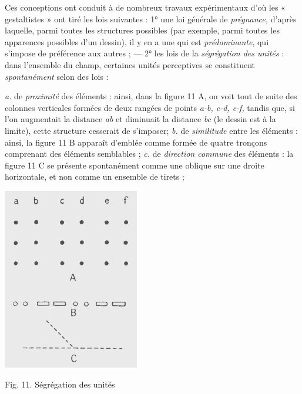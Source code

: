 \vspace{0.24cm}
{\footnotesize 
Ces conceptions ont conduit à de nombreux travaux expérimentaux
d'où les « gestaltistes » ont tiré les lois suivantes : 1° une loi générale de
\textsf{\textit {prégnance,}} d’après laquelle, parmi toutes les structures possibles (par
exemple, parmi toutes les apparences possibles d’un dessin), il y en a une
qui est {\it prédominante}, qui s'impose de préférence aux autres ; — 2° les lois
de la \textsf{\textit {ségrégation des unités}} : dans l’ensemble du champ, certaines unités
perceptives se constituent {\it spontanément} selon des lois : 

\begin{minipage}[c]{.45\linewidth}
{\it a.} de {\it proximité}
des éléments : ainsi, dans la figure 11 A, on voit tout de suite des colonnes
verticales formées de deux rangées de points {\it a-b, c-d, e-f,} tandis que, si
l’on augmentait la distance {\it ab} et diminuait la distance {\it bc} (le dessin est à
la limite), cette structure cesserait de s'imposer; {\it b.} de {\it similitude} entre
les éléments : ainsi, la figure 11 B apparaît d'emblée comme formée de
quatre tronçons comprenant des éléments semblables ; {\it c.} de {\it direction commune}
des éléments : la figure 11 C se présente spontanément comme une
oblique sur une droite horizontale, et non comme un ensemble de tirets ;
\end{minipage}
\hfill
\begin{minipage}[c]{.45\linewidth}
\begin{center}
\includegraphics[scale=0.6]{./05_sensible/011}

Fig. 11. Ségrégation des unités
\end{center}
\end{minipage}


}
